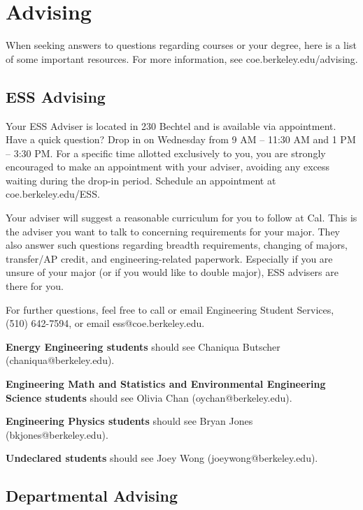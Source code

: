 \chapter*{Advising}

When seeking answers to questions regarding courses or your degree, here is a list of some important resources. For more information, see {\selectfont coe.berkeley.edu/advising}.

\section*{ESS Advising}

Your ESS Adviser is located in 230 Bechtel and is available via appointment.
Have a quick question?
Drop in on Wednesday from 9 AM – 11:30 AM and 1 PM – 3:30 PM. For a specific time allotted exclusively to you, you are strongly encouraged to make an appointment with your adviser, avoiding any excess waiting during the drop-in period. Schedule an appointment at {\selectfont coe.berkeley.edu/ESS}.

Your adviser will suggest a reasonable curriculum for you to follow at Cal. This is the adviser you want to talk to concerning requirements for your major. They also answer such questions regarding breadth requirements, changing of majors, transfer/AP credit, and engineering-related paperwork. Especially if you are unsure of your major (or if you would like to double major), ESS advisers are there for you.

For further questions, feel free to call or email Engineering Student Services, (510) 642-7594, or email {\selectfont ess@coe.berkeley.edu}.

\textbf{Energy Engineering students} should see Chaniqua Butscher ({\selectfont chaniqua@berkeley.edu}).

\textbf{Engineering Math and Statistics and Environmental Engineering Science students} should see Olivia Chan ({\selectfont oychan@berkeley.edu}).

\textbf{Engineering Physics students} should see Bryan Jones ({\selectfont bkjones@berkeley.edu}).

\textbf{Undeclared students} should see Joey Wong ({\selectfont joeywong@berkeley.edu}).

\section*{Departmental Advising}

